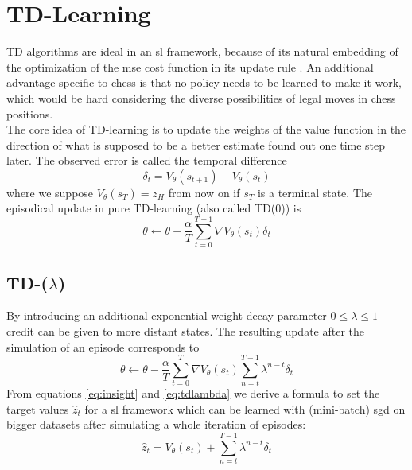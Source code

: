 \documentclass[twocolumn]{phdsymp} %
\begin{document}
\section{TD-Learning}
\label{sec:td}
TD algorithms are ideal in an \gls{sl} framework, because of its natural embedding of the optimization of the \gls{mse} cost function in its update rule \cite{rlalg}. An additional advantage specific to chess is that no policy needs to be learned to make it work, which would be hard considering the diverse possibilities of legal moves in chess positions.\\
The core idea of TD-learning is to update the weights of the value function in the direction of what is supposed to be a better estimate found out one time step later. The observed error is called the temporal difference
\begin{equation}
\delta_t=V_\theta(s_{t+1})-V_\theta(s_t)
\end{equation}
where we suppose $V_\theta(s_T)=z_H$ from now on if $s_T$ is a terminal state. The episodical update in pure TD-learning (also called TD(0)) is
\begin{equation}
\theta\leftarrow \theta-\frac{\alpha}{T}\sum_{t=0}^{T-1}\nabla V_\theta(s_t)\delta_t
\label{eq:td0}
\end{equation}

\subsection{TD-($\lambda$)}
By introducing an additional exponential weight decay parameter $0\leq\lambda\leq1$ credit can be given to more distant states. The resulting update after the simulation of an episode corresponds to
\begin{equation}
\theta\leftarrow \theta-\frac{\alpha}{T}\sum_{t=0}^{T}\nabla V_\theta(s_t)\sum_{n=t}^{T-1}\lambda^{n-t}\delta_t
\label{eq:tdlambda}
\end{equation}
From equations \ref{eq:insight} and \ref{eq:tdlambda} we derive a formula to set the target values $\hat{z}_t$ for a \gls{sl} framework which can be learned with (mini-batch) \gls{sgd} on bigger datasets after simulating a whole iteration of episodes:
\begin{equation}
\hat{z}_t=V_\theta(s_t)+\sum_{n=t}^{T-1}\lambda^{n-t}\delta_t
\label{eq:target}
\end{equation}
\end{document}
